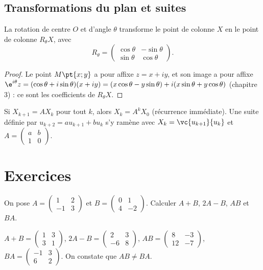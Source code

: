 \subsection{Transformations du plan et suites}
\begin{theorem}
La rotation de centre $O$ et d'angle $\theta$ transforme le point de colonne $X$ en le point de colonne $R_\theta X$, avec
\[R_\theta=\begin{pmatrix}\cos\theta&-\sin\theta\\\sin\theta&\cos\theta\end{pmatrix}.\]
\end{theorem}
\begin{proof}
Le point $M\pt{x;y}$ a pour affixe $z=x+iy$, et son image a pour affixe $\e^{i\theta}z=(\cos\theta+i\sin\theta)(x+iy)=(x\cos\theta-y\sin\theta)+i(x\sin\theta+y\cos\theta)$ (chapitre 3) : ce sont les coefficients de $R_\theta X$.
\end{proof}
\begin{method}
Si $X_{k+1}=AX_k$ pour tout $k$, alors $X_k=A^kX_0$ (récurrence immédiate). Une suite définie par $u_{k+2}=au_{k+1}+bu_k$ s'y ramène avec $X_k=\vc{u_{k+1}}{u_k}$ et $A=\begin{pmatrix}a&b\\1&0\end{pmatrix}$.
\end{method}

\mxnewpage
\section{Exercices}
\begin{exercise}[Calculs]
On pose $A=\begin{pmatrix}1&2\\-1&3\end{pmatrix}$ et $B=\begin{pmatrix}0&1\\4&-2\end{pmatrix}$. Calculer $A+B$, $2A-B$, $AB$ et $BA$.
\end{exercise}
\begin{solution}
$A+B=\begin{pmatrix}1&3\\3&1\end{pmatrix}$, $2A-B=\begin{pmatrix}2&3\\-6&8\end{pmatrix}$, $AB=\begin{pmatrix}8&-3\\12&-7\end{pmatrix}$, $BA=\begin{pmatrix}-1&3\\6&2\end{pmatrix}$. On constate que $AB\neq BA$.
\end{solution}

